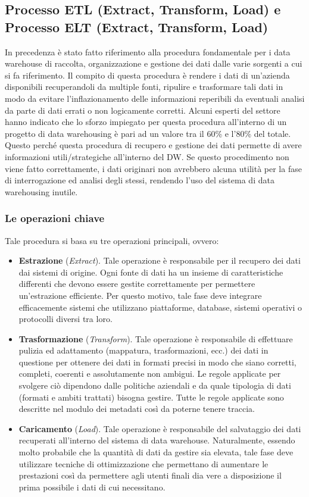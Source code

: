 \subsection{Processo ETL (Extract, Transform, Load) e Processo ELT (Extract, Transform, Load)}

In precedenza è stato fatto riferimento alla procedura fondamentale per i data warehouse di raccolta, organizzazione e gestione dei dati dalle varie sorgenti a cui si fa riferimento. Il compito di questa procedura è rendere i dati di un’azienda disponibili recuperandoli da multiple fonti, ripulire e trasformare tali dati in modo da evitare l’inflazionamento delle informazioni reperibili da eventuali analisi da parte di dati errati o non logicamente corretti. Alcuni esperti del settore hanno indicato che lo sforzo impiegato per questa procedura all’interno di un progetto di data warehousing è pari ad un valore tra il 60\% e l’80\% del totale. Questo perché questa procedura di recupero e gestione dei dati permette di avere informazioni utili/strategiche all’interno del DW. Se questo procedimento non viene fatto correttamente, i dati originari non avrebbero alcuna utilità per la fase di interrogazione ed analisi degli stessi, rendendo l’uso del sistema di data warehousing inutile.\cite{researchgate_etl_process}

\subsubsection{Le operazioni chiave}

Tale procedura si basa su tre operazioni principali, ovvero:\cite{sciencedirect_data_warehouse_model}
\begin{itemize}
    \item \textbf{Estrazione} (\textit{Extract}). Tale operazione è responsabile per il recupero dei dati dai sistemi di origine. Ogni fonte di dati ha un insieme di caratteristiche differenti che devono essere gestite correttamente per permettere un’estrazione efficiente. Per questo motivo, tale fase deve integrare efficacemente sistemi che utilizzano piattaforme, database, sistemi operativi o protocolli diversi tra loro.
    \item \textbf{Trasformazione} (\textit{Transform}). Tale operazione è responsabile di effettuare pulizia ed adattamento (mappatura, trasformazioni, ecc.) dei dati in questione per ottenere dei dati in formati precisi in modo che siano corretti, completi, coerenti e assolutamente non ambigui. Le regole applicate per svolgere ciò dipendono dalle politiche aziendali e da quale tipologia di dati (formati e ambiti trattati) bisogna gestire. Tutte le regole applicate sono descritte nel modulo dei metadati così da poterne tenere traccia.
    \item \textbf{Caricamento} (\textit{Load}). Tale operazione è responsabile del salvataggio dei dati recuperati all’interno del sistema di data warehouse. Naturalmente, essendo molto probabile che la quantità di dati da gestire sia elevata, tale fase deve utilizzare tecniche di ottimizzazione che permettano di aumentare le prestazioni così da permettere agli utenti finali dia vere a disposizione il prima possibile i dati di cui necessitano.
\end{itemize}

